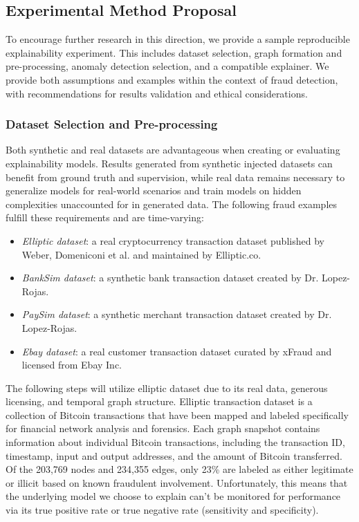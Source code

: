 \subsection{Experimental Method Proposal}
To encourage further research in this direction, we provide a sample reproducible explainability experiment. This includes dataset selection, graph formation and pre-processing, anomaly detection selection, and a compatible explainer. We provide both assumptions and examples within the context of fraud detection, with recommendations for results validation and ethical considerations.

\subsubsection{Dataset Selection and Pre-processing}
Both synthetic and real datasets are advantageous when creating or evaluating explainability models. Results generated from synthetic injected datasets can benefit from ground truth and supervision, while real data remains necessary to generalize models for real-world scenarios and train models on hidden complexities unaccounted for in generated data. The following fraud examples fulfill these requirements and are time-varying:

\begin{itemize}
    \item \textit{Elliptic dataset}\cite{weber_anti-money_2019}: a real cryptocurrency transaction dataset published by Weber, Domeniconi et al. and maintained by Elliptic.co.
    \item  \textit{BankSim dataset}\cite{lopez-rojas_banksim_2014}: a synthetic bank transaction dataset created by Dr. Lopez-Rojas.
    \item \textit{PaySim dataset}\cite{lopez-rojas_applying_2016}: a synthetic merchant transaction dataset created by Dr. Lopez-Rojas.
    \item \textit{Ebay dataset}\cite{rao_xfraud_2021}: a real customer transaction dataset curated by xFraud and licensed from Ebay Inc.
\end{itemize}

The following steps will utilize elliptic dataset due to its real data, generous licensing, and temporal graph structure. Elliptic transaction dataset is a collection of Bitcoin transactions that have been mapped and labeled specifically for financial network analysis and forensics. Each graph snapshot contains information about individual Bitcoin transactions, including the transaction ID, timestamp, input and output addresses, and the amount of Bitcoin transferred. Of the 203,769 nodes and 234,355 edges, only 23\% are labeled as either legitimate or illicit based on known fraudulent involvement\cite{weber_anti-money_2019}. Unfortunately, this means that the underlying model we choose to explain can't be monitored for performance via its true positive rate or true negative rate (sensitivity and specificity).

